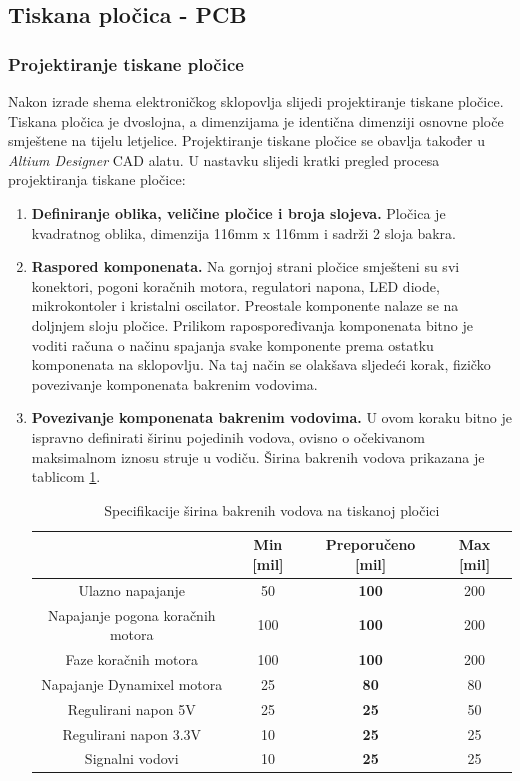 \documentclass[11pt,a4paper]{article}
\begin{document}
\subsection{Tiskana pločica - PCB}

\subsubsection{Projektiranje tiskane pločice}
Nakon izrade shema elektroničkog sklopovlja slijedi projektiranje tiskane pločice. Tiskana pločica je dvoslojna, a dimenzijama je identična dimenziji osnovne ploče smještene na tijelu letjelice. Projektiranje tiskane pločice se obavlja također u \textit{Altium Designer} CAD alatu. U nastavku slijedi kratki pregled procesa projektiranja tiskane pločice:

\begin{center}
	\begin{enumerate}
		\item \textbf{Definiranje oblika, veličine pločice i broja slojeva.} Pločica je kvadratnog oblika, dimenzija 116mm x 116mm i sadrži 2 sloja bakra.
		
		\item \textbf{Raspored komponenata.} Na gornjoj strani pločice smješteni su svi konektori, pogoni koračnih motora, regulatori napona, LED diode, mikrokontoler i kristalni oscilator. Preostale komponente nalaze se na doljnjem sloju pločice. Prilikom rapospoređivanja komponenata bitno je voditi računa o načinu spajanja svake komponente prema ostatku komponenata na sklopovlju. Na taj način se olakšava sljedeći korak, fizičko povezivanje komponenata bakrenim vodovima.
		
		\item \textbf{Povezivanje komponenata bakrenim vodovima.} U ovom koraku bitno je ispravno definirati širinu pojedinih vodova, ovisno o očekivanom maksimalnom iznosu struje u vodiču. Širina bakrenih vodova prikazana je tablicom \ref{tab:specifikacija_pcb_with}.

\begin{table}[H]
	\centering
	\caption{Specifikacije širina bakrenih vodova na tiskanoj pločici}
	\label{tab:specifikacija_pcb_with}
	\begin{tabular}{|c|c|c|c|}
			\hline 
		  					& \textbf{Min [mil]} 	& \textbf{Preporučeno [mil]}	& \textbf{Max [mil]} \\ \hline  \hline
		 Ulazno napajanje 	& 50 	& \textbf{100} 			& 200 \\ \hline
		 Napajanje pogona koračnih motora 	& 100 	& \textbf{100} 			& 200 \\ \hline
		 Faze koračnih motora 	& 100 	& \textbf{100} 			& 200 \\ \hline
		 Napajanje Dynamixel motora 	& 25 	& \textbf{80} 			& 80 \\ \hline
		 Regulirani napon 5V 	& 25 	& \textbf{25} 			& 50 \\ \hline
		 Regulirani napon 3.3V 	& 10 	& \textbf{25} 			& 25 \\ \hline
		 Signalni vodovi 	& 10 	& \textbf{25}			& 25 \\ \hline
	\end{tabular}
\end{table}		


\end{enumerate}
\end{center}
\end{document}
